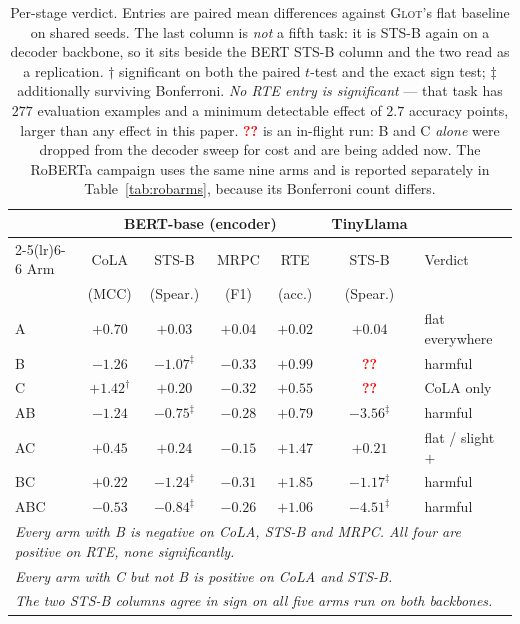 \documentclass{article}
\newcommand{\PEND}{\textcolor{red}{\textbf{??}}}
\begin{document}
\begin{table}[h]
\caption{Per-stage verdict. Entries are paired mean differences against
\textsc{Glot}'s flat baseline on shared seeds. The last column is \emph{not} a
fifth task: it is STS-B again on a decoder backbone, so it sits beside the BERT
STS-B column and the two read as a replication. $\dagger$ significant on both
the paired $t$-test and the exact sign test; $\ddagger$ additionally surviving
Bonferroni. \emph{No RTE entry is significant} --- that task has $277$
evaluation examples and a minimum detectable effect of $2.7$ accuracy points,
larger than any effect in this paper. \PEND{} is an in-flight run: B and C
\emph{alone} were dropped from the decoder sweep for cost and are being added
now. The RoBERTa campaign uses the same nine arms and is reported separately in
Table~\ref{tab:robarms}, because its Bonferroni count differs.}
\label{tab:verdict}
\begin{center}
\small
\begin{tabular}{lcccccl}
\toprule
 & \multicolumn{4}{c}{BERT-base (encoder)} & TinyLlama & \\
\cmidrule(lr){2-5}\cmidrule(lr){6-6}
Arm & CoLA & STS-B & MRPC & RTE & STS-B & Verdict \\
    & (MCC) & (Spear.) & (F1) & (acc.) & (Spear.) & \\
\midrule
A   & $+0.70$ & $+0.03$ & $+0.04$ & $+0.02$ & $+0.04$ & flat everywhere \\
B   & $-1.26$ & $-1.07^{\ddagger}$ & $-0.33$ & $+0.99$ & \PEND & harmful \\
C   & $\mathbf{+1.42}^{\dagger}$ & $+0.20$ & $-0.32$ & $+0.55$ & \PEND & CoLA only \\
\midrule
AB  & $-1.24$ & $-0.75^{\ddagger}$ & $-0.28$ & $+0.79$ & $-3.56^{\ddagger}$ & harmful \\
AC  & $+0.45$ & $\mathbf{+0.24}$ & $-0.15$ & $+1.47$ & $+0.21$ & flat / slight $+$ \\
BC  & $+0.22$ & $-1.24^{\ddagger}$ & $-0.31$ & $+1.85$ & $-1.17^{\ddagger}$ & harmful \\
ABC & $-0.53$ & $-0.84^{\ddagger}$ & $-0.26$ & $+1.06$ & $-4.51^{\ddagger}$ & harmful \\
\midrule
\multicolumn{7}{l}{\emph{Every arm with B is negative on CoLA, STS-B and MRPC.
All four are positive on RTE, none significantly.}} \\
\multicolumn{7}{l}{\emph{Every arm with C but not B is positive on CoLA and
STS-B.}} \\
\multicolumn{7}{l}{\emph{The two STS-B columns agree in sign on all five arms
run on both backbones.}} \\
\bottomrule
\end{tabular}
\end{center}
\end{table}
\end{document}
